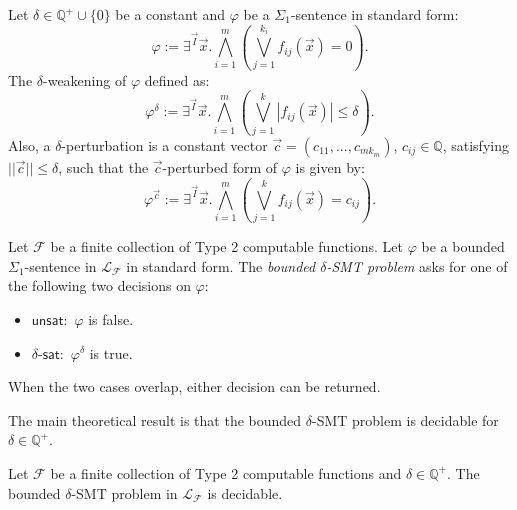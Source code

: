 \documentclass[envcountsect]{llncs}
\begin{document}
\begin{definition}\label{weak-def}
Let $\delta\in \mathbb{Q}^+\cup\{0\}$ be a constant and $\varphi$ be a
$\Sigma_1$-sentence in standard form:
\[\varphi:= \exists^{\vec I}\vec x.\bigwedge_{i=1}^m (\bigvee_{j=1}^{k_i}
f_{ij}(\vec x)= 0).
\]
The $\delta$-weakening of $\varphi$ defined as:
\[\varphi^{\delta}:= \exists^{\vec I} \vec x.\bigwedge_{i=1}^m(\bigvee_{j=1}^k
|f_{ij}(\vec x)|\leq \delta).\]
Also, a $\delta$-perturbation is a constant vector $\vec c =
(c_{11},...,c_{mk_m})$, $c_{ij}\in\mathbb{Q}$, satisfying $||\vec
c||\leq\delta$, such that the $\vec c$-perturbed form of $\varphi$ is given by:
\[\varphi^{\vec c}:= \exists^{\vec I} \vec x.\bigwedge_{i=1}^m(\bigvee_{j=1}^k
f_{ij}(\vec x) = c_{ij}).\]
\end{definition}

\begin{definition} Let
$\mathcal{F}$ be a finite collection of Type 2 computable functions. Let
$\varphi$ be a bounded $\Sigma_1$-sentence in $\mathcal{L}_{\mathcal{F}}$ in
standard form. The {\em bounded $\delta$-SMT problem} asks for one of the
following two decisions on $\varphi$:
\begin{itemize}
\item $\mathsf{unsat}:$ $\varphi$ is false.
\item $\delta$-$\mathsf{sat}:$ $\varphi^{\delta}$ is true. 
\end{itemize}
When the two cases overlap, either decision can be returned. 
\end{definition}
The main theoretical result is that the bounded $\delta$-SMT problem is
decidable for $\delta\in \mathbb{Q}^+$. 
\begin{theorem}[Decidability] Let $\mathcal{F}$ be a finite collection of Type 2
computable functions and $\delta\in \mathbb{Q}^+$. The bounded $\delta$-SMT
problem in $\mathcal{L}_{\mathcal{F}}$ is decidable.  
\end{theorem}
\end{document}
